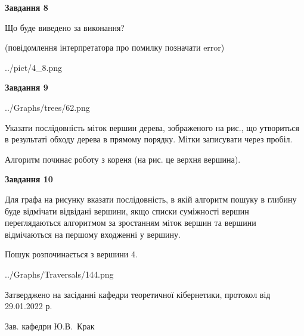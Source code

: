 \documentclass[12pt, ukrainian]{article}
\begin{document}
{\begin {large}
{\begin {center}\textbf{Завдання 8}\end {center}}\par
Що буде виведено за виконання?\par
 (повідомлення інтерпретатора про помилку позначати error)\par
\begin{center}
	{../pict/4_8.png}
\end{center}
\newpage

{\begin {center}\textbf{Завдання 9}\end {center}}\par

\begin{center}
	{../Graphs/trees/62.png}
\end{center}
Указати послідовність міток вершин дерева, зображеного на рис., що утвориться в результаті обходу дерева в прямому порядку. Мітки записувати через пробіл.\par Алгоритм починає роботу з кореня (на рис. це верхня вершина).\par
\newpage

{\begin {center}\textbf{Завдання 10}\end {center}}\par
Для графа на рисунку вказати послідовність, в якій алгоритм пошуку в глибину буде відмічати відвідані вершини, якщо списки суміжності вершин переглядаються алгоритмом за зростанням міток вершин та вершини відмічаються на першому вход\-женні у вершину.\par
Пошук розпочинається з вершини 4.\par

\begin{center}
	{../Graphs/Traversals/144.png}
\end{center}\par
\newpage


\end {large}
}
{\smallskip \begin {small} Затверджено на засіданні кафедри теоретичної кібернетики, протокол  від   29.01.2022 р.\par\smallskip\smallskip
{\parbox {6.5 cm}{Зав. кафедри \dotfill Ю.В.~Крак}} \end{small}}
\end{document}
